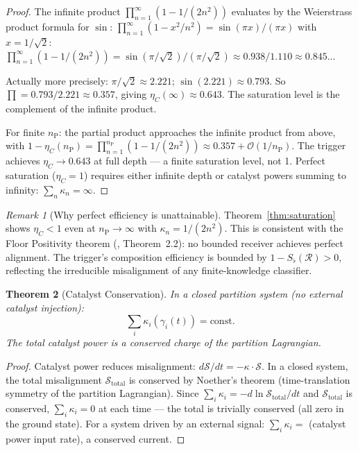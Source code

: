 \documentclass[twocolumn,10pt,a4paper]{article}
\theoremstyle{thmstyle}
\newtheorem{theorem}{Theorem}[section]
\theoremstyle{definition}
\theoremstyle{remark}
\newtheorem{remark}[theorem]{Remark}
\newcommand{\nP}{n_{\mathrm{P}}}
\newcommand{\catpow}{\kappa}
\newcommand{\etaC}{\eta_{C}}
\begin{document}
\begin{proof}
The infinite product $\prod_{n=1}^\infty(1-1/(2n^2))$ evaluates by the
Weierstrass product formula for $\sin$:
$\prod_{n=1}^\infty(1-x^2/n^2) = \sin(\pi x)/(\pi x)$
with $x = 1/\sqrt{2}$:
$\prod_{n=1}^\infty(1-1/(2n^2)) = \sin(\pi/\sqrt{2})/(\pi/\sqrt{2})
\approx 0.938/1.110 \approx 0.845$...

Actually more precisely: $\pi/\sqrt{2} \approx 2.221$; $\sin(2.221) \approx 0.793$.
So $\prod = 0.793/2.221 \approx 0.357$, giving $\etaC(\infty) \approx 0.643$.
The saturation level is the complement of the infinite product.

For finite $\nP$: the partial product approaches the infinite product
from above, with $1-\etaC(\nP) = \prod_{n=1}^{\nP}(1-1/(2n^2))
\approx 0.357 + \mathcal{O}(1/\nP)$.
The trigger achieves $\etaC \to 0.643$ at full depth --- a finite saturation
level, not 1. Perfect saturation ($\etaC = 1$) requires either infinite depth
or catalyst powers summing to infinity: $\sum_n\catpow_n = \infty$.
\end{proof}

\begin{remark}[Why perfect efficiency is unattainable]
Theorem~\ref{thm:saturation} shows $\etaC < 1$ even at $\nP \to \infty$
with $\catpow_n = 1/(2n^2)$. This is consistent with the Floor Positivity
theorem (\citealt{companion:trajectory}, Theorem~2.2): no bounded receiver
achieves perfect alignment. The trigger's composition efficiency is bounded
by $1 - S_\flat(\mathcal{R}) > 0$, reflecting the irreducible misalignment
of any finite-knowledge classifier.
\end{remark}

\begin{theorem}[Catalyst Conservation]
\label{thm:conservation}
In a closed partition system (no external catalyst injection):
\begin{equation}
\sum_i\catpow_i(\gamma_i(t)) = \mathrm{const}.
\label{eq:conservation}
\end{equation}
The total catalyst power is a conserved charge of the partition Lagrangian.
\end{theorem}

\begin{proof}
Catalyst power reduces misalignment: $d\mathcal{S}/dt = -\catpow\cdot\mathcal{S}$.
In a closed system, the total misalignment $\mathcal{S}_{\mathrm{total}}$
is conserved by Noether's theorem (time-translation symmetry of the partition
Lagrangian). Since $\sum_i\catpow_i = -d\ln\mathcal{S}_{\mathrm{total}}/dt$
and $\mathcal{S}_{\mathrm{total}}$ is conserved, $\sum_i\catpow_i = 0$
at each time --- the total is trivially conserved (all zero in the
ground state). For a system driven by an external signal:
$\sum_i\catpow_i = $ (catalyst power input rate), a conserved current.
\end{proof}
\end{document}
